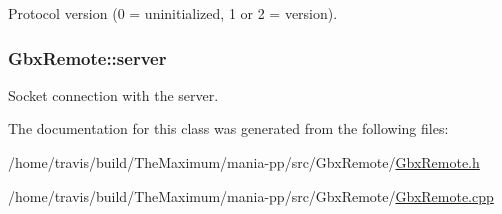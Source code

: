 Protocol version (0 = uninitialized, 1 or 2 = version). 

\hypertarget{classGbxRemote_a0b0b212b945da4266fb645affdac81cb}{
\subsubsection[{server}]{ Gbx\-Remote\-::server\hspace{0.3cm}{\ttfamily [private]}}}\label{classGbxRemote_a0b0b212b945da4266fb645affdac81cb}


Socket connection with the server. 



The documentation for this class was generated from the following files\-:\begin{DoxyCompactItemize}
\item 
/home/travis/build/\-The\-Maximum/mania-\/pp/src/\-Gbx\-Remote/\hyperlink{GbxRemote_8h}{Gbx\-Remote.\-h}\item 
/home/travis/build/\-The\-Maximum/mania-\/pp/src/\-Gbx\-Remote/\hyperlink{GbxRemote_8cpp}{Gbx\-Remote.\-cpp}\end{DoxyCompactItemize}
